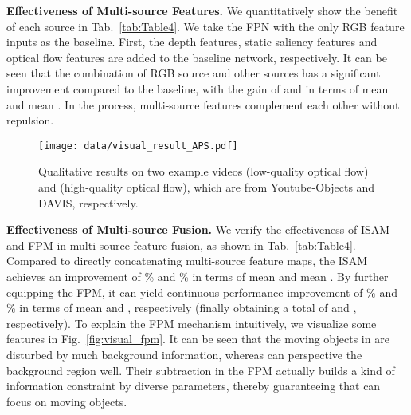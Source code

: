 \documentclass[sigconf]{acmart}
\begin{document}
\textbf{Effectiveness of Multi-source Features.} 
We quantitatively show the benefit of each source in Tab.~\ref{tab:Table4}.
We take the FPN with the only RGB feature inputs as the baseline. First, the depth features, static saliency features and optical flow features are added to the baseline network, respectively. It can be seen that the combination of RGB source and other sources has a significant improvement compared to the baseline, with the gain of  and  in terms of mean  and mean . In the process, multi-source features complement each other without repulsion.
\begin{figure*}
    \texttt{[image: data/visual\_result\_APS.pdf]}\\ \centering
    \caption{Qualitative results on two example videos  (low-quality optical flow) and  (high-quality optical flow), which are from Youtube-Objects and DAVIS, respectively.} 		
    \label{fig:Figure8}
\end{figure*} 

\textbf{Effectiveness of Multi-source Fusion.} We verify the effectiveness of ISAM and FPM in multi-source feature fusion, as shown in Tab.~\ref{tab:Table4}. Compared to directly concatenating multi-source feature maps, the ISAM achieves an improvement of \% and \% in terms of mean  and mean . By further equipping the FPM, it can yield continuous performance improvement of \% and \% in terms of mean  and , respectively (finally obtaining a total of  and , respectively). To explain the FPM mechanism intuitively, we visualize some features in Fig.~\ref{fig:visual_fpm}. It can be seen that the moving objects in  are disturbed by much background information, whereas  can perspective the background region well. Their subtraction in the FPM actually builds a kind of information constraint by diverse parameters, thereby guaranteeing that  can focus on  moving objects.
\begin{table}
	\centering
	\caption{Evaluation of the APS network on both DAVIS and Youtube-Objects in terms of mean . }
	\small
	\label{tab:Table5}
	\vspace{-5mm}
\end{table}
\end{document}
